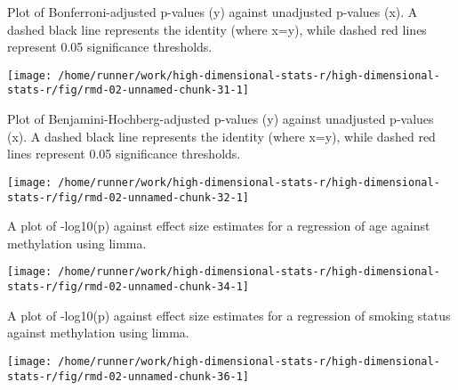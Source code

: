 \documentclass[ignorenonframetext,]{beamer}
\begin{document}
\begin{frame}{Plot of Bonferroni-adjusted p-values (y) against
unadjusted p-values (x). A dashed black line represents the identity
(where x=y), while dashed red lines represent 0.05 significance
thresholds.}
\protect\hypertarget{plot-of-bonferroni-adjusted-p-values-y-against-unadjusted-p-values-x.-a-dashed-black-line-represents-the-identity-where-xy-while-dashed-red-lines-represent-0.05-significance-thresholds.}{}

\texttt{[image: /home/runner/work/high-dimensional-stats-r/high-dimensional-stats-r/fig/rmd-02-unnamed-chunk-31-1]}



\end{frame}

\begin{frame}{Plot of Benjamini-Hochberg-adjusted p-values (y) against
unadjusted p-values (x). A dashed black line represents the identity
(where x=y), while dashed red lines represent 0.05 significance
thresholds.}
\protect\hypertarget{plot-of-benjamini-hochberg-adjusted-p-values-y-against-unadjusted-p-values-x.-a-dashed-black-line-represents-the-identity-where-xy-while-dashed-red-lines-represent-0.05-significance-thresholds.}{}

\texttt{[image: /home/runner/work/high-dimensional-stats-r/high-dimensional-stats-r/fig/rmd-02-unnamed-chunk-32-1]}



\end{frame}

\begin{frame}{A plot of -log10(p) against effect size estimates for a
regression of age against methylation using limma.}
\protect\hypertarget{a-plot-of--log10p-against-effect-size-estimates-for-a-regression-of-age-against-methylation-using-limma.}{}

\texttt{[image: /home/runner/work/high-dimensional-stats-r/high-dimensional-stats-r/fig/rmd-02-unnamed-chunk-34-1]}



\end{frame}

\begin{frame}{A plot of -log10(p) against effect size estimates for a
regression of smoking status against methylation using limma.}
\protect\hypertarget{a-plot-of--log10p-against-effect-size-estimates-for-a-regression-of-smoking-status-against-methylation-using-limma.}{}

\texttt{[image: /home/runner/work/high-dimensional-stats-r/high-dimensional-stats-r/fig/rmd-02-unnamed-chunk-36-1]}



\end{frame}
\end{document}

